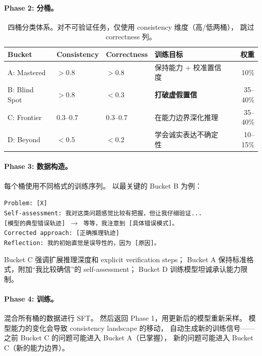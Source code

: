 \documentclass[12pt,a4paper]{article}
\begin{document}
\paragraph{Phase 2: 分桶。}

\begin{table}[h]
\centering
\small
\begin{tabular}{llllr}
\toprule
\textbf{Bucket} & \textbf{Consistency} & \textbf{Correctness} & \textbf{训练目标} & \textbf{权重} \\
\midrule
A: Mastered    & $> 0.8$ & $> 0.8$ & 保持能力 + 校准置信度 & 10\% \\
B: Blind Spot  & $> 0.8$ & $< 0.3$ & \textbf{打破虚假置信} & 35--40\% \\
C: Frontier    & $0.3$--$0.7$ & $0.3$--$0.7$ & 在能力边界深化推理 & 35--40\% \\
D: Beyond      & $< 0.5$ & $< 0.2$ & 学会诚实表达不确定性 & 10--15\% \\
\bottomrule
\end{tabular}
\caption{四桶分类体系。对不可验证任务，仅使用 consistency 维度（高/低两桶），
跳过 correctness 列。}
\label{tab:buckets}
\end{table}

\paragraph{Phase 3: 数据构造。}
每个桶使用不同格式的训练序列。
以最关键的 Bucket B 为例：

\begin{tcolorbox}[colback=gray!5,colframe=gray!50,boxrule=0.3pt,left=4pt,right=4pt]
\small
\texttt{Problem: [X]}\\[2pt]
\texttt{Self-assessment: 我对这类问题感觉比较有把握，但让我仔细验证...}\\[2pt]
\texttt{[模型的典型错误轨迹] $\rightarrow$ 等等，我注意到 [具体错误模式]。}\\[2pt]
\texttt{Corrected approach: [正确推理轨迹]}\\[2pt]
\texttt{Reflection: 我的初始直觉是误导性的，因为 [原因]。}
\end{tcolorbox}

\noindent
Bucket C 强调扩展推理深度和 explicit verification steps；
Bucket A 保持标准格式，附加``我比较确信''的 self-assessment；
Bucket D 训练模型坦诚承认能力限制。

\paragraph{Phase 4: 训练。}
混合所有桶的数据进行 SFT。
然后返回 Phase 1，用更新后的模型重新采样。
模型能力的变化会导致 consistency landscape 的移动，
自动生成新的训练信号——
之前 Bucket C 的问题可能进入 Bucket A（已掌握），
新的问题可能进入 Bucket C（新的能力边界）。
\end{document}
